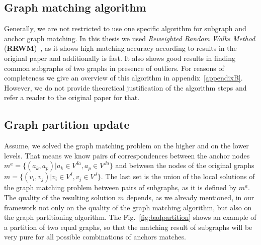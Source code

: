 \subsection{Graph matching algorithm}
Generally, we are not restricted to use one specific algorithm for subgraph and anchor graph matching. In this thesis we used \emph{Reweighted Random Walks Method} (\textbf{RRWM})~\cite{Cho2010_RRWM}, as it shows high matching accuracy according to results in the original paper and additionally is fast. It also shows good results in finding common subgraphs of two graphs in presence of outliers.
For reasons of completeness we give an overview of this algorithm in appendix~\ref{appendixB}. However, we do not provide theoretical justification of the algorithm steps and refer a reader to the original paper for that. 

\subsection{Graph partition update} \label{updateRule}
Assume, we solved the graph matching problem on the higher and on the lower levels. That means we know pairs of correspondences between the anchor nodes $m^a = \{(a_k, a_p)|a_k\in V^{Ia}, a_p\in V^{Ja}\}$ and between the nodes of the original graphs $m = \{(v_i, v_j)|v_i\in V^{I}, v_j\in V^{J}\}$. The last set is the union of the local solutions of the graph matching problem between pairs of subgraphs, as it is defined by $m^a$.
The quality of the resulting solution $m$ depends, as we already mentioned, in our framework not only on the quality of the graph matching algorithm, but also on the graph partitioning algorithm.	
The Fig.~\ref{fig:badpartition} shows an example of a partition of two equal graphs, so that the matching result of subgraphs will be very pure for all possible combinations of anchors matches.

